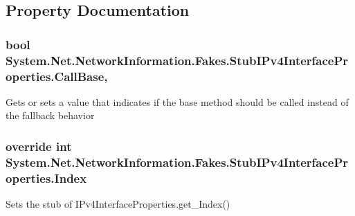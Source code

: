 \subsection{Property Documentation}
\hypertarget{class_system_1_1_net_1_1_network_information_1_1_fakes_1_1_stub_i_pv4_interface_properties_aced4fa77ee220201d1a8f0d5b89462a3}{
\subsubsection[{Call\-Base}]{\setlength{\rightskip}{0pt plus 5cm}bool System.\-Net.\-Network\-Information.\-Fakes.\-Stub\-I\-Pv4\-Interface\-Properties.\-Call\-Base\hspace{0.3cm}{\ttfamily [get]}, {\ttfamily [set]}}}\label{class_system_1_1_net_1_1_network_information_1_1_fakes_1_1_stub_i_pv4_interface_properties_aced4fa77ee220201d1a8f0d5b89462a3}


Gets or sets a value that indicates if the base method should be called instead of the fallback behavior

\hypertarget{class_system_1_1_net_1_1_network_information_1_1_fakes_1_1_stub_i_pv4_interface_properties_a238ed62e7142510fdca75ec1b08df05c}{
\subsubsection[{Index}]{\setlength{\rightskip}{0pt plus 5cm}override int System.\-Net.\-Network\-Information.\-Fakes.\-Stub\-I\-Pv4\-Interface\-Properties.\-Index\hspace{0.3cm}{\ttfamily [get]}}}\label{class_system_1_1_net_1_1_network_information_1_1_fakes_1_1_stub_i_pv4_interface_properties_a238ed62e7142510fdca75ec1b08df05c}


Sets the stub of I\-Pv4\-Interface\-Properties.\-get\-\_\-\-Index()

